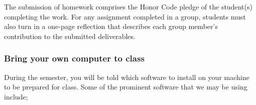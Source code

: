 \documentclass[11pt]{article} %
\begin{document}
The submission of homework comprises the Honor Code pledge of the student(s) completing the work. For any assignment completed in a group, students must also turn in a one-page reflection that describes each group member's contribution to the submitted deliverables.  




\subsubsection*{\textbf{Bring your own computer to class}}

During the semester, you will be told which software to install on your machine to be prepared for class. Some of the prominent software that we may be using include;
\end{document}
